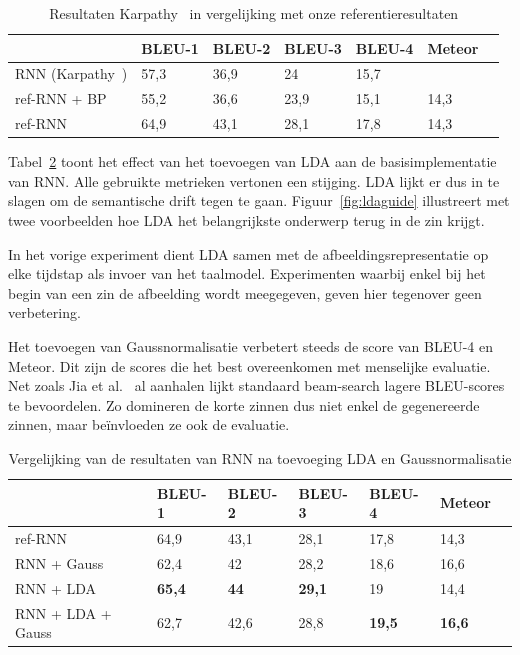 \begin{table}
	\centering
	\begin{tabular}{lllllll}
		& BLEU-1 & BLEU-2 & BLEU-3 & BLEU-4 & Meteor \\ \hline
		RNN (Karpathy~\cite{Karpathy2015})    & 57,3   & 36,9   & 24     & 15,7   & ~           \\    
		ref-RNN + BP     & 55,2   & 36,6   & 23,9   & 15,1   & 14,3          \\
		ref-RNN          & 64,9  & 43,1     & 28,1   & 17,8   & 14,3          \\\hline
	\end{tabular}

	\caption[Resultaten Karpathy in vergelijking met onze referentieresultaten]{Resultaten Karpathy~\cite{Karpathy2015} in vergelijking met onze referentieresultaten}
	\label{table:karpathy_met_bp}
\end{table}

Tabel~\ref{table:rnn_met_lda} toont het effect van het toevoegen van LDA aan de basisimplementatie van RNN. Alle gebruikte metrieken vertonen een stijging. LDA lijkt er dus in te slagen om de semantische drift tegen te gaan.
Figuur~\ref{fig:ldaguide} illustreert met twee voorbeelden hoe LDA het belangrijkste onderwerp terug in de zin krijgt.

In het vorige experiment dient LDA samen met de afbeeldingsrepresentatie op elke tijdstap als invoer van het taalmodel. Experimenten waarbij enkel bij het begin van een zin de afbeelding wordt meegegeven, geven hier tegenover geen verbetering. 

Het toevoegen van Gaussnormalisatie verbetert steeds de score van BLEU-4 en Meteor. Dit zijn de scores die het best overeenkomen met menselijke evaluatie. Net zoals Jia et al.~\cite{Fernando2015} al aanhalen lijkt standaard beam-search lagere BLEU-scores te bevoordelen. Zo domineren de korte zinnen dus niet enkel de gegenereerde zinnen, maar be\"invloeden ze ook de evaluatie.

\begin{table}
	\centering
	\begin{tabular}{lllllll}
		& BLEU-1 & BLEU-2 & BLEU-3 & BLEU-4 & Meteor \\ \hline
		ref-RNN        & 64,9   & 43,1   & 28,1   & 17,8   & 14,3          \\
		RNN + Gauss       & 62,4   & 42     & 28,2   & 18,6   & 16,6          \\
		RNN + LDA         & \textbf{65,4}   & \textbf{44}     & \textbf{29,1}   & 19     & 14,4          \\
		RNN + LDA + Gauss & 62,7   & 42,6   & 28,8   & \textbf{19,5}   & \textbf{16,6}          \\ \hline
	\end{tabular}
	\caption{Vergelijking van de resultaten van RNN na toevoeging LDA en Gaussnormalisatie}	
	\label{table:rnn_met_lda}
\end{table}

